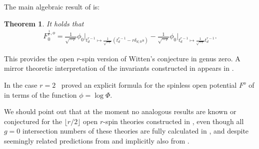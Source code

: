 \documentclass[11pt]{amsart}
\newtheorem{thm}[dummy]{Theorem}
\theoremstyle{definition}
\theoremstyle{remark}
\newcommand{\<}{\left<}
\renewcommand{\>}{\right>}
\numberwithin{equation}{section}
\begin{document}
The main algebraic result of \cite{BCT2} is:

\begin{thm}\label{thm:main_BCT2}
It holds that
\begin{gather}\label{eq:main_res_BCT}
F^{\frac{1}{r},o}_0=\frac{1}{\sqrt{-r}}\phi_0\big|_{t^{r-1}_d\mapsto \frac{1}{\sqrt{-r}}(t^{r-1}_d-r\delta_{d,0}s)}-\frac{1}{\sqrt{-r}}\phi_0\big|_{t^{r-1}_d\mapsto\frac{1}{\sqrt{-r}}t^{r-1}_d}.
\end{gather}
\end{thm}
\noindent This provides the open $r$-spin version of Witten's conjecture in genus zero. A mirror theoretic interpretation of the invariants constructed in \cite{BCT2} appears in \cite{GKT}.


In the case $r=2$~\cite{Bur16} proved  an explicit formula for the spinless open potential $F^o$ of \cite{PST14,Tes15} in terms of the function $\phi=\log\Phi$. 


We should point out that at the moment no analogous results are known or conjectured for the $\lfloor r/2\rfloor$ open $r$-spin theories constructed in \cite{TZ1,TZ2}, even though all $g=0$ intersection numbers of these theories are fully calculated in \cite{TZ2}, and despite seemingly related predictions from \cite{Horiprivate} and implicitly also from \cite{Hori}.
\end{document}
